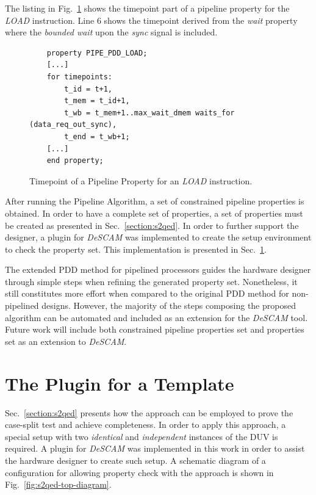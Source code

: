 The listing in Fig.~\ref{fig:load-ptt-merg-algorithm} shows the timepoint part of a pipeline property for the \textit{LOAD} instruction. Line 6 shows the timepoint derived from the \textit{wait} property where the \textit{bounded wait} upon the \textit{sync} signal is included. 

\begin{figure}[htb!]
    \begin{lstlisting}
    property PIPE_PDD_LOAD;
    [...]
    for timepoints:
        t_id = t+1,
        t_mem = t_id+1,
        t_wb = t_mem+1..max_wait_dmem waits_for (data_req_out_sync),
        t_end = t_wb+1;
    [...]
    end property;\end{lstlisting}
    \caption{Timepoint of a Pipeline Property for an \textit{LOAD} instruction.}
    \label{fig:load-ptt-merg-algorithm}
\end{figure}

After running the Pipeline Algorithm, a set of constrained pipeline properties is obtained. In order to have a complete set of properties, a set of \SSQED{} properties must be created as presented in Sec.~\ref{section:s2qed}. In order to further support the designer, a plugin for \textit{DeSCAM} was implemented to create the setup environment to check the \SSQED{} property set. This implementation is presented in Sec.~\ref{section:plugio-s2qed-top}.

The extended PDD method for pipelined processors guides the hardware designer through simple steps when refining the generated property set. Nonetheless, it still constitutes more effort when compared to the original PDD method for non-pipelined designs. However, the majority of the steps composing the proposed algorithm can be automated and included as an extension for the \textit{DeSCAM} tool. Future work will include both constrained pipeline properties set and \SSQED{} properties set as an extension to \textit{DeSCAM}.

\section{The Plugin for a \SSQED{} Template}
\label{section:plugio-s2qed-top}

Sec.~\ref{section:s2qed} presents how the \SSQED{} approach can be employed to prove the case-split test and achieve completeness. In order to apply this approach, a special setup with two \textit{identical} and \textit{independent} instances of the DUV is required. A plugin for \textit{DeSCAM} was implemented in this work in order to assist the hardware designer to create such setup. A schematic diagram of a configuration for allowing property check with the \SSQED{} approach is shown in Fig.~\ref{fig:s2qed-top-diagram}. 

